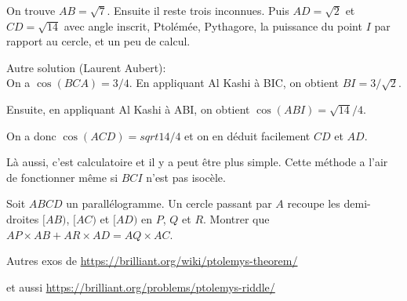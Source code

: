 \begin{exo}
\begin{center}
\end{center}
\begin{sol}
On trouve $AB=\sqrt 7$. Ensuite il reste trois inconnues. Puis $AD=\sqrt 2$ et $CD=\sqrt{14}$ avec angle inscrit, Ptolémée, Pythagore, la puissance du point $I$ par rapport au cercle, et un peu de calcul.

Autre solution (Laurent Aubert):\\

On a $\cos(BCA)=3/4$. En appliquant Al Kashi à BIC, on obtient $BI=3/\sqrt 2$.

Ensuite, en appliquant Al Kashi à ABI, on obtient $\cos(ABI)=\sqrt{14}/4$.

On a donc $\cos(ACD)=sqrt{14}/4$ et on en déduit facilement $CD$ et $AD$.

Là aussi, c'est calculatoire et il y a peut être plus simple. Cette méthode a l'air de fonctionner même si $BCI$ n'est pas isocèle.


\end{sol}
\end{exo}



\begin{exo}
Soit $ABCD$ un parallélogramme.
Un cercle passant par $A$ recoupe les demi-droites $[AB)$, $[AC)$ et $[AD)$ en $P$, $Q$ et $R$.
Montrer que $AP\times AB + AR\times AD = AQ\times AC$.
\begin{center}
\end{center}
\end{exo}


Autres exos de \url{https://brilliant.org/wiki/ptolemys-theorem/}

et aussi \url{https://brilliant.org/problems/ptolemys-riddle/}





\indications
\correction



